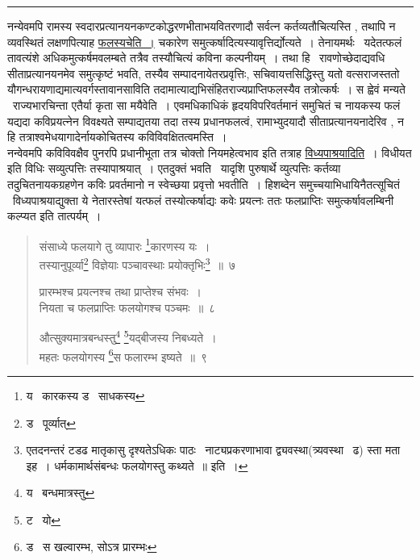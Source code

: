\documentclass[11pt, openany]{book}
\begin{document}
\hrule

\vspace{2mm}
नन्येवमपि रामस्य स्वदारप्रत्यानयनकण्टकोद्धरणभीताभयवितरणादौ सर्वत्न कर्तव्यतौचित्यस्ति , तथापि न व्यवस्थितं लक्षणपित्याह \underline{फलस्यचेति~।} चकारेण समुत्कर्षादित्यस्यावृत्तिर्द्योत्यते~। तेनायमर्थः \textendash\ यदेतत्फलं तावत्यंशे अधिकमुत्कर्षमवलम्बते तत्रैव तस्यौचित्यं कविना कल्पनीयम्~। तथा हि \textendash\ रावणोच्छेदाद्यवधि सीताप्रत्यानयनमेव समुत्कृष्टं भवति, तस्यैव सम्पादनायेतरप्रवृत्तिः, सचिवायत्तसिद्धिस्तु यतो वत्सराजस्ततो यौगन्धरायणाद्यमात्यवर्गस्तावानसाविति तदामात्याद्यभिसंहितराज्यप्राप्तिफलस्यैव तत्रोत्कर्षः~। स ह्वेवं मन्यते \textendash\ राज्यभारचिन्ता एतैर्या कृता सा मयैवेति~। एवमधिकाधिकं हृदयविपरिवर्तमानं समुचितं च नायकस्य फलं यद्यदा कविप्रयत्नेन विवक्ष्यते सम्पाद्यतया तदा तस्य प्रधानफलत्वं, रामाभ्युदयादौ सीताप्रत्यानयनादेरिव , न हि तत्राश्वमेधयागादेर्नायकोचितस्य कविविवक्षितत्वमस्ति~।\\

नन्वेवमपि कविविवक्षैव पुनरपि प्रधानीभूता तत्र चोक्तो नियमहेत्वभाव इति तत्राह \underline{विध्यपाश्रयादिति}~। विधीयत इति विधिः सव्युत्पत्तिः तस्यापाश्रयात्~। एतदुक्तं भवति \textendash\ यादृशि पुरुषार्थे व्युत्पत्तिः कर्तव्या तदुचितनायकग्रहणेन कविः प्रवर्तमानो न स्वेच्छया प्रवृत्तो भवतीति~। हिशब्देन समुच्चयाभिधायिनैतत्सूचितं \textendash\ विध्यपाश्रयाद्युक्ता ये नेतारस्तेषां यत्फलं तस्योत्कर्षाद्यः कवेः प्रयत्नः ततः फलप्राप्तिः समुत्कर्षावलम्बिनी कल्प्यत इति तात्पर्यम्~।

\newpage

\begin{quote}
{\na संसाध्ये फलयागे तु व्यापारः \renewcommand{\thefootnote}{1}\footnote{य \textendash\ कारकस्य ड \textendash\ साधकस्य}कारणस्य यः~।\\
तस्यानुपूर्व्या\renewcommand{\thefootnote}{2}\footnote{ड \textendash\ पूर्व्यात्} विज्ञेयाः पञ्चावस्थाः प्रयोक्तृभिः\renewcommand{\thefootnote}{3}\footnote{एतदनन्तरं टडढ मातृकासु दृश्यतेऽधिकः पाठः \textendash\ नाट्यप्रकरणाभावा द्व्यवस्था(त्र्यवस्था \textendash\ ढ) स्ता मता इह~। धर्मकामार्थसंबन्धः फलयोगस्तु कथ्यते~॥ इति~।}~॥~७

प्रारम्भश्च प्रयत्नश्च तथा प्राप्तेश्च संभवः~।\\
नियता च फलप्राप्तिः फलयोगश्च पञ्चमः~॥~८

औत्सुक्यमात्रबन्धस्तु\renewcommand{\thefootnote}{4}\footnote{य \textendash\ बन्धमात्रस्तु} \renewcommand{\thefootnote}{5}\footnote{ट \textendash\ यो}यद्बीजस्य निबध्यते~।\\
महतः फलयोगस्य \renewcommand{\thefootnote}{6}\footnote{ड \textendash\ स खल्वारम्भ, सोऽत्र प्रारम्भः}स फलारम्भ इष्यते~॥~९}
\end{quote}
\end{document}
